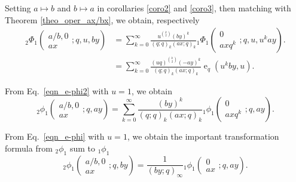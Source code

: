\documentclass{cimart}
\DeclareMathOperator{\ope}{e}
\begin{document}
Setting $a\mapsto b$ and $b\mapsto a$ in corollaries \ref{coro2} and \ref{coro3}, then matching with Theorem \ref{theo_oper_ax/bx}, we obtain, respectively
\begin{align}
    {}_{2}\Phi_{1}\left(
    \begin{array}{c}
         a/b,0\\
         ax
    \end{array}
    ;q,u,by
    \right)&=\sum_{k=0}^{\infty}\frac{u^{\binom{k}{2}}(by)^k}{(q;q)_{k}(ax;q)_{k}}{}_{1}\Phi_{1}\left(
        \begin{array}{c}
             0 \\
             axq^k
        \end{array};
        q,u,u^kay
        \right)\label{eqn_e-phi2}.\\
        &=\sum_{k=0}^{\infty}\frac{(uq)^{\binom{k}{2}}(-ay)^k}{(q;q)_{k}(ax;q)_{k}}\ope_{q}(u^{k}by,u)\label{eqn_e-phi}.
\end{align}

\begin{corollary}
From Eq.~\eqref{eqn_e-phi2} with $u=1$, we obtain
\begin{equation}
    {}_{2}\phi_{1}\left(
        \begin{array}{c}
             a/b,0 \\
             ax
        \end{array};
        q,ay
        \right)=\sum_{k=0}^{\infty}\frac{(by)^k}{(q;q)_{k}(ax;q)_{k}}{}_{1}\phi_{1}\left(
        \begin{array}{c}
             0 \\
             axq^k
        \end{array};
        q,ay
        \right).
\end{equation}
\end{corollary}

\begin{corollary}
From Eq.~\eqref{eqn_e-phi} with $u=1$, we obtain the important transformation formula from ${}_{2}\phi_{1}$ sum to ${}_{1}\phi_{1}$
\begin{equation}
    {}_{2}\phi_{1}\left(
        \begin{array}{c}
             a/b,0 \\
             ax
        \end{array};
        q,by
        \right)=\frac{1}{(by;q)_{\infty}}{}_{1}\phi_{1}\left(
        \begin{array}{c}
             0 \\
             ax
        \end{array};
        q,ay
        \right).
\end{equation}
\end{corollary}
\end{document}
